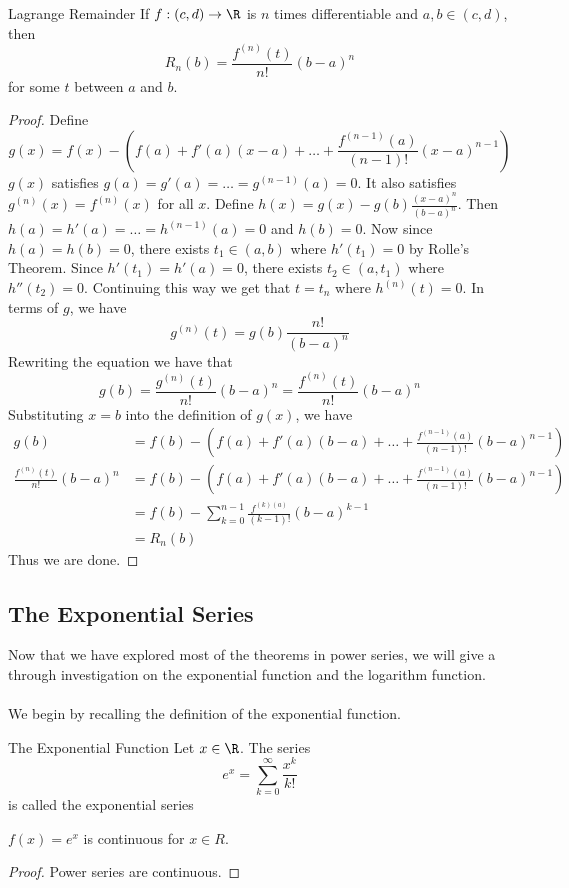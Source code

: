 \begin{thm}{Lagrange Remainder}{} If $f:(c,d)\to\R$ is $n$ times differentiable and $a,b\in(c,d)$, then $$R_n(b)=\frac{f^{(n)}(t)}{n!}(b-a)^n$$ for some $t$ between $a$ and $b$. \tcbline
\begin{proof} Define $$g(x)=f(x)-\left(f(a)+f'(a)(x-a)+\dots+\frac{f^{(n-1)}(a)}{(n-1)!}(x-a)^{n-1}\right)$$ $g(x)$ satisfies $g(a)=g'(a)=\dots=g^{(n-1)}(a)=0$. It also satisfies $g^{(n)}(x)=f^{(n)}(x)$ for all $x$. Define $h(x)=g(x)-g(b)\frac{(x-a)^n}{(b-a)^n}$. Then $h(a)=h'(a)=\dots=h^{(n-1)}(a)=0$ and $h(b)=0$. Now since $h(a)=h(b)=0$, there exists $t_1\in(a,b)$ where $h'(t_1)=0$ by Rolle's Theorem. Since $h'(t_1)=h'(a)=0$, there exists $t_2\in(a,t_1)$ where $h''(t_2)=0$. Continuing this way we get that $t=t_n$ where $h^{(n)}(t)=0$. In terms of $g$, we have $$g^{(n)}(t)=g(b)\frac{n!}{(b-a)^n}$$ Rewriting the equation we have that $$g(b)=\frac{g^{(n)}(t)}{n!}(b-a)^n=\frac{f^{(n)}(t)}{n!}(b-a)^n$$ Substituting $x=b$ into the definition of $g(x)$, we have 
\begin{align*}
g(b)&=f(b)-\left(f(a)+f'(a)(b-a)+\dots+\frac{f^{(n-1)}(a)}{(n-1)!}(b-a)^{n-1}\right)\\
\frac{f^{(n)}(t)}{n!}(b-a)^n&=f(b)-\left(f(a)+f'(a)(b-a)+\dots+\frac{f^{(n-1)}(a)}{(n-1)!}(b-a)^{n-1}\right)\\
&=f(b)-\sum_{k=0}^{n-1}\frac{f^{(k)(a)}}{(k-1)!}(b-a)^{k-1}\\
&=R_n(b)
\end{align*}
Thus we are done. 
\end{proof}
\end{thm}

\subsection{The Exponential Series}
Now that we have explored most of the theorems in power series, we will give a through investigation on the exponential function and the logarithm function. \\~\\
We begin by recalling the definition of the exponential function. 
\begin{defn}{The Exponential Function}{} Let $x\in\R$. The series $$e^x=\sum_{k=0}^\infty \frac{x^k}{k!}$$ is called the exponential series
\end{defn}

\begin{thm}{}{} $f(x)=e^x$ is continuous for $x\in R$. \tcbline
\begin{proof} Power series are continuous. 
\end{proof}
\end{thm}

